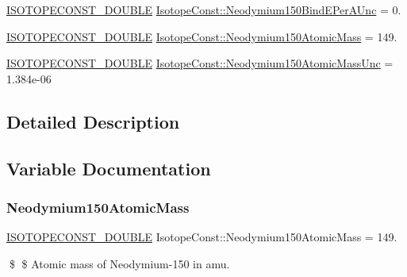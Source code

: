 \begin{DoxyCompactItemize}
\mbox{\hyperlink{group___isotope_const-_macros_ga8f45a7272ce02c0b4c65c44636ed719a}{I\+S\+O\+T\+O\+P\+E\+C\+O\+N\+S\+T\+\_\+\+D\+O\+U\+B\+LE}} \mbox{\hyperlink{group___isotope_const-_neodymium-_nd150_ga7c9aa05e5e50e7ea691e5c3bccbdbec8}{Isotope\+Const\+::\+Neodymium150\+Bind\+E\+Per\+A\+Unc}} = 0.
\item 
\mbox{\hyperlink{group___isotope_const-_macros_ga8f45a7272ce02c0b4c65c44636ed719a}{I\+S\+O\+T\+O\+P\+E\+C\+O\+N\+S\+T\+\_\+\+D\+O\+U\+B\+LE}} \mbox{\hyperlink{group___isotope_const-_neodymium-_nd150_gad52e131c048091f1179d4cbdd3614f01}{Isotope\+Const\+::\+Neodymium150\+Atomic\+Mass}} = 149.
\item 
\mbox{\hyperlink{group___isotope_const-_macros_ga8f45a7272ce02c0b4c65c44636ed719a}{I\+S\+O\+T\+O\+P\+E\+C\+O\+N\+S\+T\+\_\+\+D\+O\+U\+B\+LE}} \mbox{\hyperlink{group___isotope_const-_neodymium-_nd150_ga1f5faab25a28e0519039e1554208c346}{Isotope\+Const\+::\+Neodymium150\+Atomic\+Mass\+Unc}} = 1.\+384e-\/06
\end{DoxyCompactItemize}


\subsection{Detailed Description}


\subsection{Variable Documentation}
\mbox{\label{group___isotope_const-_neodymium-_nd150_gad52e131c048091f1179d4cbdd3614f01}} 
\subsubsection{\texorpdfstring{Neodymium150\+Atomic\+Mass}{Neodymium150AtomicMass}}
{\footnotesize\ttfamily \mbox{\hyperlink{group___isotope_const-_macros_ga8f45a7272ce02c0b4c65c44636ed719a}{I\+S\+O\+T\+O\+P\+E\+C\+O\+N\+S\+T\+\_\+\+D\+O\+U\+B\+LE}} Isotope\+Const\+::\+Neodymium150\+Atomic\+Mass = 149.}

\$ \$ Atomic mass of Neodymium-\/150 in amu. \mbox{\label{group___isotope_const-_neodymium-_nd150_ga1f5faab25a28e0519039e1554208c346}} 
